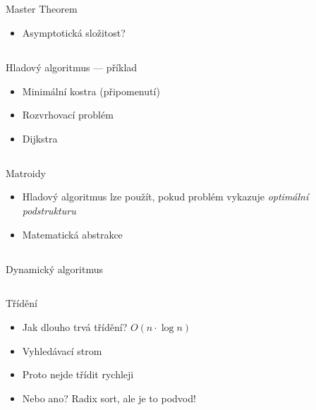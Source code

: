 \documentclass{beamer}
\begin{document}
\subsection{}
\begin{frame}{Master Theorem}
\begin{itemize}
\item Asymptotická složitost?
\end{itemize}
\end{frame}

\subsection{}
\begin{frame}{Hladový algoritmus --- příklad}
\begin{itemize}
\item Minimální kostra (připomenutí)
\item Rozvrhovací problém
\item Dijkstra
\end{itemize}
\end{frame}

\subsection{}
\begin{frame}{Matroidy}
\begin{itemize}
\item Hladový algoritmus lze použít, pokud problém vykazuje {\em optimální podstrukturu}
\item Matematická abstrakce
\end{itemize}
\end{frame}

\subsection{}
\begin{frame}{Dynamický algoritmus}
\end{frame}

\subsection{}
\begin{frame}{Třídění}
\begin{itemize}
\item Jak dlouho trvá třídění? $O(n\cdot\log n)$
\item Vyhledávací strom
\item Proto nejde třídit rychleji
\item Nebo ano? Radix sort, ale je to podvod!
\end{itemize}
\end{frame}
\end{document}

